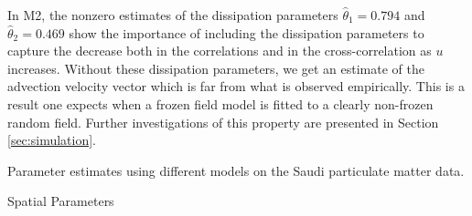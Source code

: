 \documentclass[12pt]{article}
\newcommand{\0}{\mathbf{0}}
\begin{document}
In M2, the nonzero estimates of the dissipation parameters $\hat \theta_1=0.794$ and $\hat \theta_2=0.469$ show the importance of including the dissipation parameters to capture the decrease both in the correlations and in the cross-correlation as $u$ increases. Without these dissipation parameters, we get an estimate of the advection velocity vector which is far from what is observed empirically. This is a result one expects when a frozen field model is fitted to a clearly non-frozen random field. Further investigations of this property are presented in Section \ref{sec:simulation}.

\begin{table}[t!]
\centering
\caption{\small Parameter estimates using different models on the Saudi particulate matter data.}
\caption*{\small Spatial Parameters}
\bigskip
\caption*{\small Temporal Parameters}
\end{table}
\end{document}
